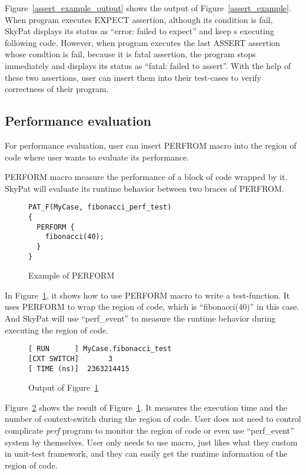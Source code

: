 \documentclass[final]{ols}
\begin{document}
Figure~\ref{assert_example_output} shows the output of Figure~\ref{assert_example}.
When program executes EXPECT assertion, although its condition is fail, SkyPat displays its status as ``error: failed to expect'' and keep s executing following code.
However, when program executes the last ASSERT assertion whose condtion is fail, because it is fatal assertion, the program stops immediately and displays its status as ``fatal: failed to assert''.
With the help of these two assertions, user can insert them into their test-cases to verify correctness of their program.

\subsection{Performance evaluation}
For performance evaluation, user can insert PERFROM macro into the region of code where user wants to evaluate its performance.

PERFORM macro measure the performance of a block of code wrapped by it.
SkyPat will evaluate its runtime behavior between two braces of PERFROM.

\begin{figure}[h]
\lstset{language=C++}
\begin{lstlisting}[frame=single]
PAT_F(MyCase, fibonacci_perf_test)
{
  PERFORM {
    fibonacci(40);
  }
}
\end{lstlisting}
\caption{Example of PERFORM}
\label{perform_example}
\end{figure}

In Figure~\ref{perform_example}, it shows how to use PERFORM macro to write a test-function.
It uses PERFORM to wrap the region of code, which is ``fibonacci(40)'' in this case.
And SkyPat will use ``perf\_event'' to measure the runtime behavior during executing the region of code.

\begin{figure}[h]
\lstset{language=sh}
\begin{lstlisting}[frame=single]
[ RUN      ] MyCase.fibonacci_test
[CXT SWITCH]       3
[ TIME (ns)]  2363214415
\end{lstlisting}
\caption{Output of Figure~\ref{perform_example}}
\label{perform_example_output}
\end{figure}

Figure~\ref{perform_example_output} shows the result of Figure~\ref{perform_example}.
It measures the execution time and the number of context-switch during the region of code.
User does not need to control complicate \textit{perf} program to monitor the region of code or even use ``perf\_event'' system by themselves.
User only needs to use macro, just likes what they custom in unit-test framework, and they can easily get the runtime information of the region of code.
\end{document}

